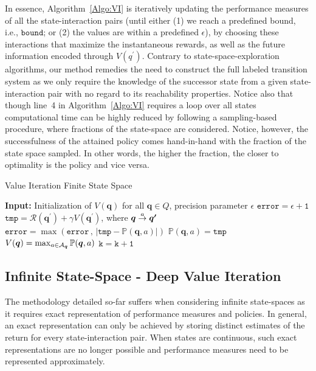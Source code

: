In essence, Algorithm~\ref{Algo:VI} is iteratively updating the performance measures of all the state-interaction pairs (until either (1) we reach a predefined bound, i.e., $\mathtt{bound}$; or (2) the values are within a predefined $\epsilon$),  by choosing these interactions that maximize the instantaneous rewards, as well as the future information encoded through $V(q^{\prime})$. 
Contrary to state-space-exploration algorithms, our method remedies the need to construct the full labeled transition system as we only require the knowledge of the successor state from a given state-interaction pair with no regard to its reachability properties. Notice also that though line~4 in Algorithm~\ref{Algo:VI} requires a loop over all states computational time can be highly reduced by following a sampling-based procedure, where fractions of the state-space are considered. Notice, however, the successfulness of the attained policy comes hand-in-hand with the fraction of the state space sampled. In other words, the higher the fraction, the closer to optimality is the policy and vice versa. 
\vspace*{-0.5cm}
\begin{algorithm}[h]
\caption{Value Iteration Finite State Space}
\label{Algo:VI}
\begin{algorithmic}[1]
\STATE \textbf{Input:} Initialization of $V( \bm{q})$ for all $ \bm{q}\in Q$, precision parameter $\epsilon$
\STATE $\mathtt{error = \epsilon + 1} $
			\STATE $\mathtt{tmp} = \mathcal{R}( \bm{q^{\prime}}) + \gamma V( \bm{q^{\prime}})$, where $ \bm{q} \goesto[a] \bm{q^{\prime}}$
		\STATE $\mathtt{error} =\max(\mathtt{error}\, , \, |\mathtt{tmp} - \mathbb{P}( \bm{q}, a)|)$
			\STATE $\mathbb{P}( \bm{q}, a) = \mathtt{tmp}$
		\ENDFOR
	\STATE $V( \bm{q}) =  \max_{a \in {\cal A}_{\bm{q}}} \mathbb{P}(\bm{q}, a)$
	\ENDFOR
	\STATE $\mathtt{k = k + 1}$
\ENDWHILE
\end{algorithmic}
\end{algorithm}
\vspace*{-0.8cm}

\subsection{Infinite State-Space - Deep Value Iteration}
The methodology detailed so-far suffers when considering infinite state-spaces as it requires exact representation of performance measures and policies. In general, an exact representation can only be achieved by storing distinct estimates of the return for every state-interaction pair. When states are continuous, such exact representations are no longer possible and performance measures need to be represented approximately. 

